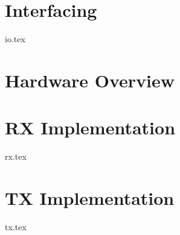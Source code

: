 \documentclass{book}
\begin{document}
\chapter{Interfacing}
{io.tex}

\chapter{Hardware Overview}

\chapter{RX Implementation}
{rx.tex}

\chapter{TX Implementation}
{tx.tex}
\end{document}
